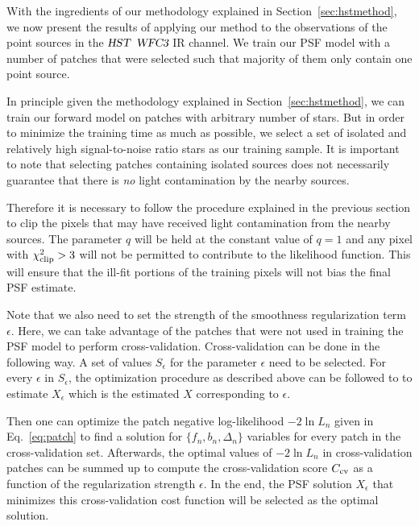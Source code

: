 With the ingredients of our methodology explained in Section~\ref{sec:hstmethod}, we now present the results of applying our 
method to the observations of the point sources in the ${\textsl{HST}}$ ${\textsl{WFC3}}$ IR channel. We train our PSF model with a number of 
patches that were selected such that majority of them only contain one point source. 

In principle given the methodology explained in Section~\ref{sec:hstmethod}, we can train our forward model on patches with arbitrary 
number of stars. But in order to minimize the training time as much as possible, we select a set of isolated and 
relatively high signal-to-noise ratio stars as our training sample.
It is important to note that selecting patches containing isolated sources does not necessarily guarantee that there is \emph{no} light contamination 
by the nearby sources. %

Therefore it is necessary to follow the procedure explained in the previous section to clip the pixels that may have received light 
contamination from the nearby sources. The parameter $q$ will be held at the constant value of $q=1$ and any pixel with $\chi^{2}_{\rm clip} > 3 $ 
will not be permitted to contribute to the likelihood function. 
This will ensure that the ill-fit portions of the training pixels will not bias the final PSF estimate. 

Note that we also need to set the strength of the smoothness regularization term $\epsilon$. Here, we can take advantage of the patches that were not used 
in training the PSF model to perform cross-validation. Cross-validation can be done in the following way. A set of values $S_{\epsilon}$ for the parameter $\epsilon$ need to be selected. For every $\epsilon$ in $S_{\epsilon}$, the optimization procedure as described above can be followed to to estimate $X_{\epsilon}$ which is the estimated $X$ corresponding to $\epsilon$. 

Then one can optimize the patch negative log-likelihood $-2\ln L_n$ given in Eq.~\ref{eq:patch} to find a solution for $\{f_n,b_n,\Delta_n\}$
variables for every patch in the cross-validation set. Afterwards, the optimal values of $-2\ln L_n$ in cross-validation patches can be summed up to 
compute the cross-validation score $C_{\rm cv}$ as a function of the regularization strength $\epsilon$.
In the end, the PSF solution $X_{\epsilon}$ that minimizes this cross-validation cost function will be selected as the optimal solution.

